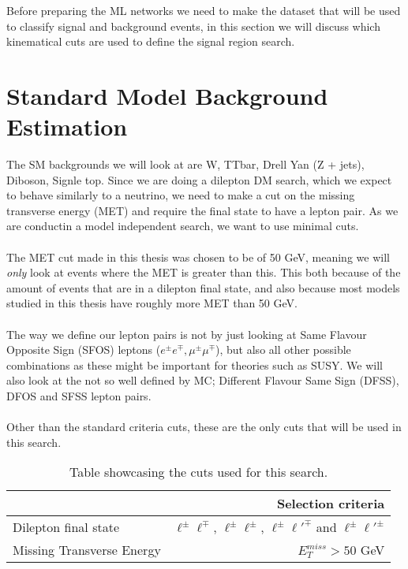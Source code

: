 \documentclass[14pt, a4paper]{book}
\begin{document}
Before preparing the ML networks we need to make the dataset that will be used to classify signal and background events, in this section we will discuss which kinematical cuts are used to define the signal region search. 




\section{Standard Model Background Estimation}
The SM backgrounds we will look at are W, TTbar, Drell Yan (Z + jets), Diboson, Signle top. Since we are doing a dilepton DM search, which we expect to behave similarly to a neutrino, 
we need to make a cut on the missing transverse energy (MET) and require the final state to have a lepton pair. As we are conductin a model independent search, we want to use minimal cuts.\\
\\The MET cut made in this thesis was chosen to be of 50 GeV, meaning we will \textit{only} look at events where the MET is greater than this. 
This both because of the amount of events that are in a dilepton final state, and also because most models studied in this thesis have roughly more MET than 50 GeV.\\
\\The way we define our lepton pairs is not by just looking at Same Flavour Opposite Sign (SFOS) leptons ($e^\pm e^\mp, \mu^\pm\mu^\mp$), but also all other possible combinations as these might be important for theories such as SUSY.
We will also look at the not so well defined by MC; Different Flavour Same Sign (DFSS), DFOS and SFSS lepton pairs. \\
\\Other than the standard criteria cuts, these are the only cuts that will be used in this search.
\begin{table}[!h]
    \centering
    \begin{tabular}{l|r}\midrule\midrule
                                                                                & Selection criteria        \\\midrule
        Dilepton final state                                                    & $\ell^\pm \ell^\mp$, $\ell^\pm \ell^\pm$, $\ell^\pm \ell'^\mp$ and $\ell^\pm \ell'^\pm$    \\
        Missing Transverse Energy                                               & $E_T^{miss} > 50$ GeV     \\\midrule\midrule
    \end{tabular}
    \caption[Cuts for model-indepentent search]{Table showcasing the cuts used for this search.}
    \label{tab:MI_Cuts}
\end{table}
\end{document}
